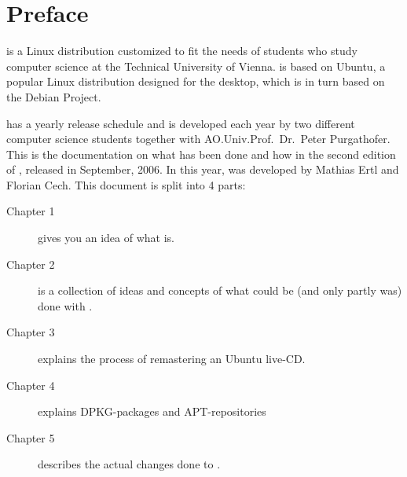 
\maketitle

\chapter{Preface}
\tunix is a Linux distribution customized to fit the needs of students who study
computer science at the Technical University of Vienna. \tunix is based on
Ubuntu, a popular Linux distribution designed for the desktop, which is in turn
based on the Debian Project.

\tunix has a yearly release schedule and is developed each year by two different 
computer science students together with AO.Univ.Prof.\ Dr.\ Peter Purgathofer. 
This is the documentation on what has been done and how in the second
edition of \tunix, released in September, 2006. In this year, \tunix was developed
by Mathias Ertl and Florian Cech. This document is split into 4 parts:
\begin{description}
\item[Chapter 1] gives you an idea of what \tunix is.
\item[Chapter 2] is a collection of ideas and concepts of what could be (and only
partly was) done with \tunix.
\item[Chapter 3] explains the process of remastering an Ubuntu live-CD.
\item[Chapter 4] explains DPKG-packages and APT-repositories
\item[Chapter 5] describes the actual changes done to \tunix.
\end{description}


\tableofcontents
\lstlistoflistings
